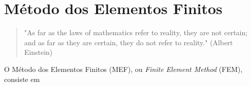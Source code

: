 \chapter{Método dos Elementos Finitos}

\begin{quote}
    "As far as the laws of mathematics refer to reality, they are not certain; and as far as they are certain, they do not refer to reality." (Albert Einstein)
\end{quote}

O Método dos Elementos Finitos (MEF), ou \textit{Finite Element Method} (FEM), consiste em 